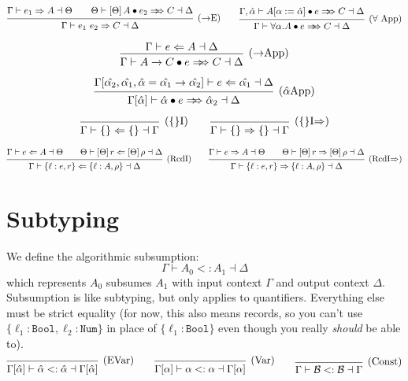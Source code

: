\documentclass{article}
\renewcommand{\implies}{\Rightarrow}
\newcommand{\B}{\mathcal{B}}
\newcommand{\subtype}{<:}
\newcommand{\synthesizes}{\Rightarrow \!\!\! \Rightarrow}
\newcommand{\app}{\bullet}
\newcommand{\prj}{\,\pmb{\#}\,}
\newcommand{\ev}{\hat}
\newcommand{\spc}{\qquad}
\newcommand{\apply}[1]{\left[#1\right]}
\newcommand{\synth}[4]{#1 \vdash #2 \Rightarrow #3 \dashv #4}
\renewcommand{\check}[4]{#1 \vdash #2 \Leftarrow #3 \dashv #4}
\newcommand{\presynth}[6]{#1 \vdash #2 #3 #4 \synthesizes #5 \dashv #6}
\newcommand{\subtypes}[4]{#1 \vdash #2 \subtype #3 \dashv #4}
\newcommand{\lookup}[5]{#1 \vdash #2 \# #3 \longrightarrow #4 \dashv #5}
\newcommand{\deduct}[3][]
{
  \begin{prooftree}
    \hypo{#2}
    \infer1[\text{#1}]{#3}
  \end{prooftree}
}
\begin{document}
\[
  \deduct[(\(\to\)E)]
  { \synth{\Gamma}{e_1}{A}{\Theta} \spc \presynth{\Theta}{\apply\Theta A}{\app}{e_2}{C}{\Delta} }
  { \synth{\Gamma}{e_1 \ e_2}{C}{\Delta}  }
  \spc
  \deduct[(\(\forall\) App)]
  { \presynth{\Gamma, \ev\alpha}{A[\alpha := \ev\alpha]}{\app}{e}{C}{\Delta} }
  { \presynth{\Gamma}{\forall \alpha. A}{\app}{e}{C}{\Delta} }
\]

\[
  \deduct[(\(\to\)App)]
    { \check{\Gamma}{e}{A}{\Delta} }
    { \presynth{\Gamma}{A \to C}{\app}{e}{C}{\Delta} }
\]

\[
  \deduct[(\(\ev\alpha\)App)]
    {
      \check{\Gamma[\ev{\alpha_2}, \ev{\alpha_1}, \ev \alpha = \ev{\alpha_1} \to
        \ev{\alpha_2}]}{e}{\ev{\alpha_1}}{\Delta}
    }
    { \presynth{\Gamma[\ev\alpha]}{\ev\alpha}{\app}{e}{\ev\alpha_2}{\Delta} }
\]


\[
\deduct[(\{\}I)]{}{\check{\Gamma}{\{\}}{\{\}}{\Gamma}}
\spc
\deduct[(\{\}I\(\implies\))]{}{\synth{\Gamma}{\{\}}{\{\}}{\Gamma}}
\]

\[
  \deduct[(RcdI)]
  { \check{\Gamma}{e}{A}{\Theta} \spc \check{\Theta}{\apply\Theta r}{\apply\Theta\rho}{\Delta} }
  { \check{\Gamma}{\{\ell : e , r \}}{\{\ell : A, \rho\}}{\Delta} }
  \spc
  \deduct[(RcdI\(\implies\))]
  { \synth{\Gamma}{e}{A}{\Theta} \spc \synth{\Theta}{\apply\Theta r}{\apply\Theta \rho}{\Delta} }
  { \synth{\Gamma}{\{\ell : e , r \}}{\{\ell : A, \rho\}}{\Delta} }
\]



\section{Subtyping}
We define the algorithmic subsumption:
\[
\subtypes{\Gamma}{A_0}{A_1}{\Delta}
\]
which represents $A_0$ subsumes $A_1$ with input context $\Gamma$ and output
context $\Delta$. Subsumption is like subtyping, but only applies to
quantifiers. Everything else must be strict equality (for now, this also means
records, so you can't use \(\{\ell_1: \texttt{Bool}, \ell_2: \texttt{Num}\}\) in
place of \(\{\ell_1 : \texttt{Bool}\}\) even though you really \emph{should} be
able to).
\[
  \deduct[(EVar)]{}{\subtypes{\Gamma[\ev\alpha]}{\ev\alpha}{\ev\alpha}{\Gamma[\ev\alpha]}}
  \spc
  \deduct[(Var)]{}{\subtypes{\Gamma[\alpha]}{\alpha}{\alpha}{\Gamma[\alpha]}}
  \spc
  \deduct[(Const)]{}{\subtypes{\Gamma}{\B}{\B}{\Gamma}}
\]
\end{document}

